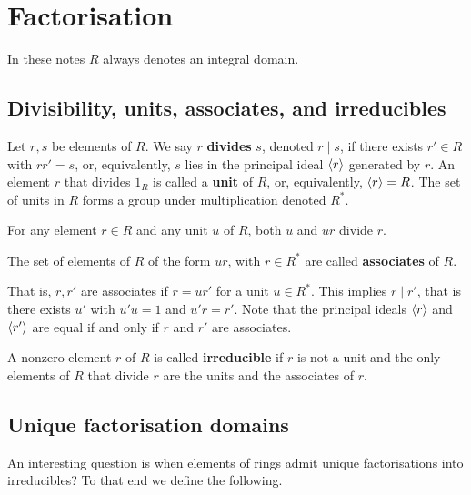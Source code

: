 \pagebreak

\section{Factorisation}

In these notes $ R $ always denotes an integral domain.

\subsection{Divisibility, units, associates, and irreducibles}

\begin{definition}
Let $ r, s $ be elements of $ R $. We say $ r $ \textbf{divides} $ s $, denoted $ r \mid s $, if there exists $ r' \in R $ with $ rr' = s $, or, equivalently, $ s $ lies in the principal ideal $ \left\langle r \right\rangle $ generated by $ r $. An element $ r $ that divides $ 1_R $ is called a \textbf{unit} of $ R $, or, equivalently, $ \left\langle r \right\rangle = R $. The set of units in $ R $ forms a group under multiplication denoted $ R^* $.
\end{definition}

For any element $ r \in R $ and any unit $ u $ of $ R $, both $ u $ and $ ur $ divide $ r $.

\begin{definition}
The set of elements of $ R $ of the form $ ur $, with $ r \in R^* $ are called \textbf{associates} of $ R $.
\end{definition}

That is, $ r, r' $ are associates if $ r = ur' $ for a unit $ u \in R^* $. This implies $ r \mid r' $, that is there exists $ u' $ with $ u'u = 1 $ and $ u'r = r' $. Note that the principal ideals $ \left\langle r \right\rangle $ and $ \left\langle r' \right\rangle $ are equal if and only if $ r $ and $ r' $ are associates.

\begin{definition}
A nonzero element $ r $ of $ R $ is called \textbf{irreducible} if $ r $ is not a unit and the only elements of $ R $ that divide $ r $ are the units and the associates of $ r $.
\end{definition}

\subsection{Unique factorisation domains}

An interesting question is when elements of rings admit unique factorisations into irreducibles? To that end we define the following.

